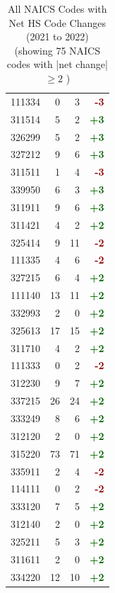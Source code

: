 \documentclass[11pt]{article}
\begin{document}
\begin{table}[H]
\begin{minipage}{0.48\textwidth}
\begin{tabular}{lrrr}
111334 & 0 & 3 & \textcolor{darkred}{\textbf{-3}} \\
311514 & 5 & 2 & \textcolor{darkgreen}{\textbf{+3}} \\
326299 & 5 & 2 & \textcolor{darkgreen}{\textbf{+3}} \\
327212 & 9 & 6 & \textcolor{darkgreen}{\textbf{+3}} \\
311511 & 1 & 4 & \textcolor{darkred}{\textbf{-3}} \\
339950 & 6 & 3 & \textcolor{darkgreen}{\textbf{+3}} \\
311911 & 9 & 6 & \textcolor{darkgreen}{\textbf{+3}} \\
311421 & 4 & 2 & \textcolor{darkgreen}{\textbf{+2}} \\
325414 & 9 & 11 & \textcolor{darkred}{\textbf{-2}} \\
111335 & 4 & 6 & \textcolor{darkred}{\textbf{-2}} \\
327215 & 6 & 4 & \textcolor{darkgreen}{\textbf{+2}} \\
111140 & 13 & 11 & \textcolor{darkgreen}{\textbf{+2}} \\
332993 & 2 & 0 & \textcolor{darkgreen}{\textbf{+2}} \\
325613 & 17 & 15 & \textcolor{darkgreen}{\textbf{+2}} \\
311710 & 4 & 2 & \textcolor{darkgreen}{\textbf{+2}} \\
111333 & 0 & 2 & \textcolor{darkred}{\textbf{-2}} \\
312230 & 9 & 7 & \textcolor{darkgreen}{\textbf{+2}} \\
337215 & 26 & 24 & \textcolor{darkgreen}{\textbf{+2}} \\
333249 & 8 & 6 & \textcolor{darkgreen}{\textbf{+2}} \\
312120 & 2 & 0 & \textcolor{darkgreen}{\textbf{+2}} \\
315220 & 73 & 71 & \textcolor{darkgreen}{\textbf{+2}} \\
335911 & 2 & 4 & \textcolor{darkred}{\textbf{-2}} \\
114111 & 0 & 2 & \textcolor{darkred}{\textbf{-2}} \\
333120 & 7 & 5 & \textcolor{darkgreen}{\textbf{+2}} \\
312140 & 2 & 0 & \textcolor{darkgreen}{\textbf{+2}} \\
325211 & 5 & 3 & \textcolor{darkgreen}{\textbf{+2}} \\
311611 & 2 & 0 & \textcolor{darkgreen}{\textbf{+2}} \\
334220 & 12 & 10 & \textcolor{darkgreen}{\textbf{+2}} \\
\bottomrule
\end{tabular}
\end{minipage}
\caption{All NAICS Codes with Net HS Code Changes (2021 to 2022) (showing 75 NAICS codes with |net change| $\geq 2$ )}
\end{table}
\end{document}
